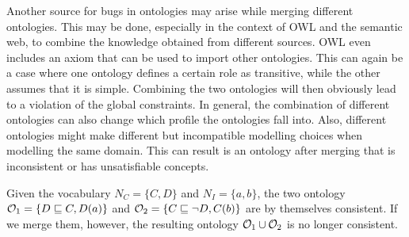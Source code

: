 Another source for bugs in ontologies may arise while merging different ontologies. This may be done, especially in the context of OWL and the semantic web, to combine the knowledge obtained from different sources. OWL even includes an axiom that can be used to import other ontologies. This can again be a case where one ontology defines a certain role as transitive, while the other assumes that it is simple. Combining the two ontologies will then obviously lead to a violation of the global constraints. In general, the combination of different ontologies can also change which profile the ontologies fall into. Also, different ontologies might make different but incompatible modelling choices when modelling the same domain. This can result is an ontology after merging that is inconsistent or has unsatisfiable concepts.

\begin{example}
  Given the vocabulary $N_C = \{ C, D \}$ and $N_I = \{ a, b \}$, the two \SROIQ ontology $\mathcal{O}_1 = \{ D \sqsubseteq C, D(a) \}$ and $\mathcal{O}_2 = \{ C \sqsubseteq \lnot D, C(b) \}$ are by themselves consistent. If we merge them, however, the resulting ontology $\mathcal{O}_1 \cup \mathcal{O}_2$ is no longer consistent.
\end{example}

